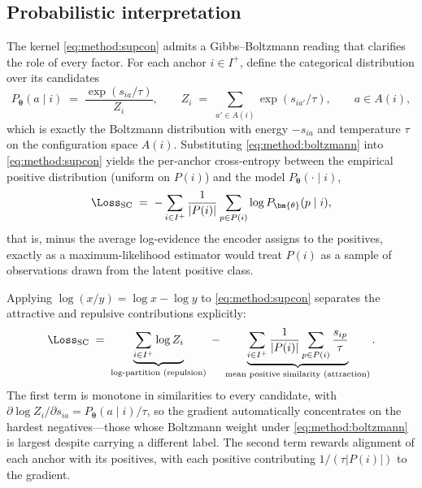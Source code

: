 \subsection*{Probabilistic interpretation}

The kernel \cref{eq:method:supcon} admits a Gibbs--Boltzmann reading that clarifies the role of every factor.
For each anchor $i \in I^{+}$, define the categorical distribution over its candidates
\begin{equation}\label{eq:method:boltzmann}
  P_{\bm{\theta}}(a \mid i) \;=\; \frac{\exp(s_{ia}/\tau)}{Z_i},
  \qquad
  Z_i \;=\; \sum_{a' \in A(i)} \exp(s_{ia'}/\tau),
  \qquad a \in A(i),
\end{equation}
which is exactly the Boltzmann distribution with energy $-s_{ia}$ and temperature $\tau$ on the configuration space $A(i)$.
Substituting \cref{eq:method:boltzmann} into \cref{eq:method:supcon} yields the per-anchor cross-entropy between the empirical positive distribution (uniform on $P(i)$) and the model $P_{\bm{\theta}}(\cdot \mid i)$,
\begin{equation}\label{eq:method:supcon_logp}
  \Loss_{\mathrm{SC}}
  \;=\;
  -\sum_{i \in I^{+}} \frac{1}{\lvert P(i)\rvert}
  \sum_{p \in P(i)} \log P_{\bm{\theta}}(p \mid i),
\end{equation}
that is, minus the average log-evidence the encoder assigns to the positives, exactly as a maximum-likelihood estimator would treat $P(i)$ as a sample of observations drawn from the latent positive class.

Applying $\log(x/y) = \log x - \log y$ to \cref{eq:method:supcon} separates the attractive and repulsive contributions explicitly:
\begin{equation}\label{eq:method:supcon_split}
  \Loss_{\mathrm{SC}}
  \;=\;
  \underbrace{\sum_{i \in I^{+}} \log Z_i}_{\text{log-partition (repulsion)}}
  \;-\;
  \underbrace{\sum_{i \in I^{+}} \frac{1}{\lvert P(i)\rvert} \sum_{p \in P(i)} \frac{s_{ip}}{\tau}}_{\text{mean positive similarity (attraction)}}.
\end{equation}
The first term is monotone in similarities to every candidate, with $\partial \log Z_i / \partial s_{ia} = P_{\bm{\theta}}(a\mid i)/\tau$, so the gradient automatically concentrates on the hardest negatives---those whose Boltzmann weight under \cref{eq:method:boltzmann} is largest despite carrying a different label.
The second term rewards alignment of each anchor with its positives, with each positive contributing $1/(\tau\lvert P(i)\rvert)$ to the gradient.

